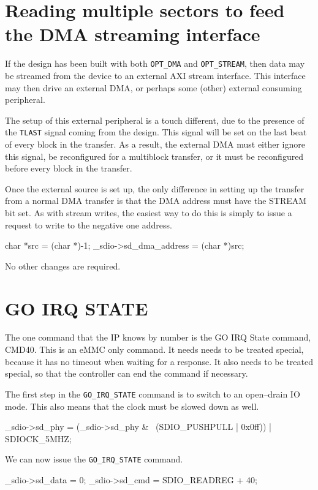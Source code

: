 \documentclass{gqtekspec}
\begin{document}
\section{Reading multiple sectors to feed the DMA streaming interface}
If the design has been built with both {\tt OPT\_DMA} and
{\tt OPT\_STREAM}, then data may be streamed from the device to an
external AXI stream interface.  This interface may then drive
an external DMA, or perhaps some (other) external consuming peripheral.

The setup of this external peripheral is a touch different, due to the
presence of the {\tt TLAST} signal coming from the design.  This signal
will be set on the last beat of every block in the transfer.  As a result,
the external DMA must either ignore this signal, be reconfigured for a
multiblock transfer, or it must be reconfigured before every block
in the transfer.

Once the external source is set up, the only difference in setting up the
transfer from a normal DMA transfer is that the DMA address must have the
STREAM bit set.  As with stream writes, the easiest way to do this is simply
to issue a request to write to the negative one address.
\begin{zCpp}
	char	*src = (char *)-1;
	_sdio->sd_dma_address = (char *)src;
\end{zCpp}

No other changes are required.
\section{GO IRQ STATE}
The one command that the IP knows by number is the GO IRQ State command,
CMD40.  This is an eMMC only command.  It needs needs to be treated special,
because it has no timeout when waiting for a response.  It also needs to be
treated special, so that the controller can end the command if necessary.

The first step in the {\tt GO\_IRQ\_STATE} command is to switch to an
open--drain IO mode.  This also means that the clock must be slowed down
as well.

\begin{zCpp}
	_sdio->sd_phy = (_sdio->sd_phy & ~(SDIO_PUSHPULL | 0x0ff))
			| SDIOCK_5MHZ;
\end{zCpp}

We can now issue the {\tt GO\_IRQ\_STATE} command.

\begin{zCpp}
	_sdio->sd_data = 0;
	_sdio->sd_cmd  = SDIO_READREG + 40;
\end{zCpp}
\end{document}
